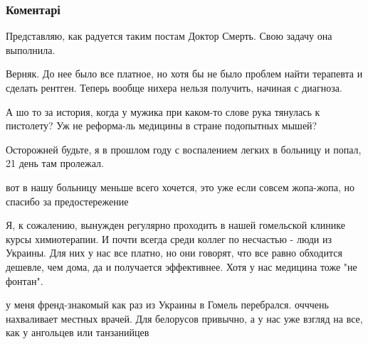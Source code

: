 
 
 
 
 
\subsubsection{Коментарі}
\label{sec:31_07_2018.fb.lesev_igor.1.lechenie_konjakom.cmt}

\begin{itemize} %
Представляю, как радуется таким постам Доктор Смерть. Свою задачу она выполнила.

\begin{itemize} %

Верняк. До нее было все платное, но хотя бы не было проблем найти терапевта и
сделать рентген. Теперь вообще нихера нельзя получить, начиная с диагноза.

\end{itemize} %

А шо то за история, когда у мужика при каком-то слове рука тянулась к пистолету? Уж не реформа-ль медицины в стране подопытных мышей?

Осторожней будьте, я в прошлом году с воспалением легких в больницу и попал, 21 день там пролежал.

\begin{itemize} %
вот в нашу больницу меньше всего хочется, это уже если совсем жопа-жопа, но спасибо за предостережение
\end{itemize} %


Я, к сожалению, вынужден регулярно проходить в нашей гомельской клинике курсы
химиотерапии. И почти всегда среди коллег по несчастью - люди из Украины. Для
них у нас все платно, но они говорят, что все равно обходится дешевле, чем
дома, да и получается эффективнее. Хотя у нас медицина тоже "не фонтан".

\begin{itemize} %

у меня френд-знакомый как раз из Украины в Гомель перебрался. очччень
нахваливает местных врачей. Для белорусов привычно, а у нас уже взгляд на все,
как у ангольцев или танзанийцев


\end{itemize}
\end{itemize}
